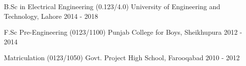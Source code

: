 \begin{cventries}
	\cventry
	{B.Sc in Electrical Engineering (0.123/4.0)}
	{University of Engineering and Technology, Lahore}
	{}
	{2014 - 2018}
	{}
	  
	\cventry
	{F.Sc Pre-Engineering (0123/1100)}
	{Punjab College for Boys, Sheikhupura}
	{}
	{2012 - 2014}
	{}
	
	\cventry
	{Matriculation (0123/1050)}
	{Govt. Project High School, Farooqabad}
	{}
	{2010 - 2012}
	{}
		
\end{cventries}
